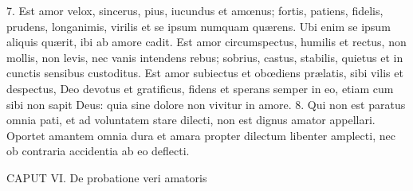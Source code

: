 7. Est amor velox, sincerus, pius, iucundus et amœnus; fortis, patiens, fidelis, prudens, longanimis, virilis et se ipsum numquam quærens. Ubi enim se ipsum aliquis quærit, ibi ab amore cadit. Est amor circumspectus, humilis et rectus, non mollis, non levis, nec vanis intendens rebus; sobrius, castus, stabilis, quietus et in cunctis sensibus custoditus. Est amor subiectus et obœdiens prælatis, sibi vilis et despectus, Deo devotus et gratificus, fidens et sperans semper in eo, etiam cum sibi non sapit Deus: quia sine dolore non vivitur in amore.
8. Qui non est paratus omnia pati, et ad voluntatem stare dilecti, non est dignus amator appellari. Oportet amantem omnia dura et amara propter dilectum libenter amplecti, nec ob contraria accidentia ab eo deflecti.


CAPUT VI.
De probatione veri amatoris

